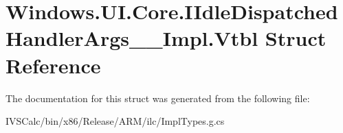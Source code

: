 \hypertarget{struct_windows_1_1_u_i_1_1_core_1_1_i_idle_dispatched_handler_args_____impl_1_1_vtbl}{}\section{Windows.\+U\+I.\+Core.\+I\+Idle\+Dispatched\+Handler\+Args\+\_\+\+\_\+\+Impl.\+Vtbl Struct Reference}
\label{struct_windows_1_1_u_i_1_1_core_1_1_i_idle_dispatched_handler_args_____impl_1_1_vtbl}


The documentation for this struct was generated from the following file\+:\begin{DoxyCompactItemize}
\item 
I\+V\+S\+Calc/bin/x86/\+Release/\+A\+R\+M/ilc/Impl\+Types.\+g.\+cs\end{DoxyCompactItemize}
